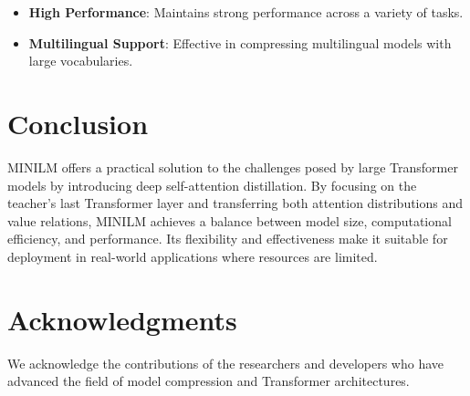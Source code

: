 \documentclass{article}
\begin{document}
\begin{itemize}  
    \item \textbf{High Performance}: Maintains strong performance across a variety of tasks.  
    \item \textbf{Multilingual Support}: Effective in compressing multilingual models with large vocabularies.  
\end{itemize}  
  
\section{Conclusion}  
  
MINILM offers a practical solution to the challenges posed by large Transformer models by introducing deep self-attention distillation. By focusing on the teacher's last Transformer layer and transferring both attention distributions and value relations, MINILM achieves a balance between model size, computational efficiency, and performance. Its flexibility and effectiveness make it suitable for deployment in real-world applications where resources are limited.  
  
\section*{Acknowledgments}  
  
We acknowledge the contributions of the researchers and developers who have advanced the field of model compression and Transformer architectures.  
  
\end{document}
